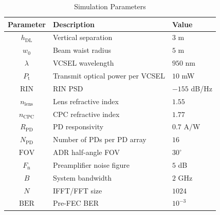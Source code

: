 \documentclass[lettersize,journal]{IEEEtran}
\begin{document}
\renewcommand{\arraystretch}{1.0}%
\begin{table}[t!]
	\centering
	\caption{Simulation Parameters}
	\begin{tabular}{c|l|l}
		\textbf{Parameter}    & \textbf{Description}                & \textbf{Value} \\ \hline
		$h_\mathrm{DL}$       & Vertical separation                 & $3$ m          \\ 
		$w_0$                 & Beam waist radius                   & $5$ \textmu m  \\
		$\lambda$             & VCSEL wavelength                    & $950$ nm       \\ 
        $P_\mathrm{t}$        & Transmit optical power per VCSEL    & $10$ mW        \\
        $\mathrm{RIN}$        & RIN PSD 	                        & $-155$ dB/Hz   \\ 
 	$n_\mathrm{lens}$     & Lens refractive index               & $1.55$         \\
 	$n_\mathrm{CPC}$      & CPC refractive index                & $1.77$         \\
		$R_\mathrm{PD}$       & PD responsivity                     & $0.7$ A$/$W    \\
 	$N_\mathrm{PD}$       & Number of PDs per PD array          & $16$           \\
 	$\mathrm{FOV}$        & ADR half-angle FOV                  & $30^\circ$     \\
 	$F_\mathrm{n}$   	  & Preamplifier noise figure           & $5$ dB         \\
		$B$                   & System bandwidth                    & $2$ GHz        \\
        $N$                   & IFFT/FFT size                       & $1024$         \\
		$\mathrm{BER}$        & Pre-FEC BER                         & $10^{-3}$      \\ \hline
	\end{tabular}
	\label{Tab:5_1}
	\vspace{-10pt}
\end{table}

\end{document}
